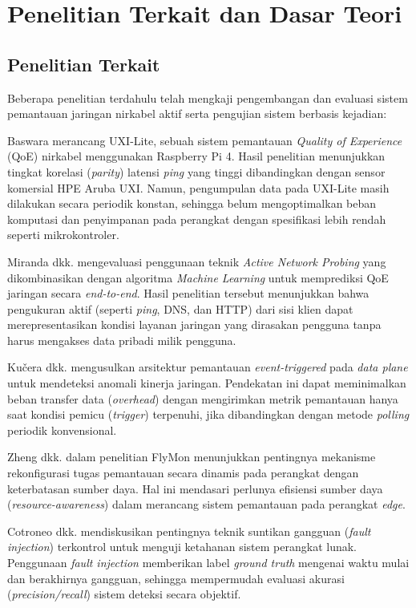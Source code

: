 \section{Penelitian Terkait dan Dasar Teori}
\label{sec-penelitian-terkait}

\subsection{Penelitian Terkait}

Beberapa penelitian terdahulu telah mengkaji pengembangan dan evaluasi sistem pemantauan jaringan nirkabel aktif serta pengujian sistem berbasis kejadian:

Baswara \cite{baswara2026} merancang UXI-Lite, sebuah sistem pemantauan \textit{Quality of Experience} (QoE) nirkabel menggunakan Raspberry Pi 4. Hasil penelitian menunjukkan tingkat korelasi (\textit{parity}) latensi \textit{ping} yang tinggi dibandingkan dengan sensor komersial HPE Aruba UXI. Namun, pengumpulan data pada UXI-Lite masih dilakukan secara periodik konstan, sehingga belum mengoptimalkan beban komputasi dan penyimpanan pada perangkat dengan spesifikasi lebih rendah seperti mikrokontroler.

Miranda dkk. \cite{miranda2022} mengevaluasi penggunaan teknik \textit{Active Network Probing} yang dikombinasikan dengan algoritma \textit{Machine Learning} untuk memprediksi QoE jaringan secara \textit{end-to-end}. Hasil penelitian tersebut menunjukkan bahwa pengukuran aktif (seperti \textit{ping}, DNS, dan HTTP) dari sisi klien dapat merepresentasikan kondisi layanan jaringan yang dirasakan pengguna tanpa harus mengakses data pribadi milik pengguna.

Ku{\v{c}}era dkk. \cite{kucera2020} mengusulkan arsitektur pemantauan \textit{event-triggered} pada \textit{data plane} untuk mendeteksi anomali kinerja jaringan. Pendekatan ini dapat meminimalkan beban transfer data (\textit{overhead}) dengan mengirimkan metrik pemantauan hanya saat kondisi pemicu (\textit{trigger}) terpenuhi, jika dibandingkan dengan metode \textit{polling} periodik konvensional.

Zheng dkk. \cite{zheng2022} dalam penelitian FlyMon menunjukkan pentingnya mekanisme rekonfigurasi tugas pemantauan secara dinamis pada perangkat dengan keterbatasan sumber daya. Hal ini mendasari perlunya efisiensi sumber daya (\textit{resource-awareness}) dalam merancang sistem pemantauan pada perangkat \textit{edge}.

Cotroneo dkk. \cite{cotroneo2022} mendiskusikan pentingnya teknik suntikan gangguan (\textit{fault injection}) terkontrol untuk menguji ketahanan sistem perangkat lunak. Penggunaan \textit{fault injection} memberikan label \textit{ground truth} mengenai waktu mulai dan berakhirnya gangguan, sehingga mempermudah evaluasi akurasi (\textit{precision/recall}) sistem deteksi secara objektif.

